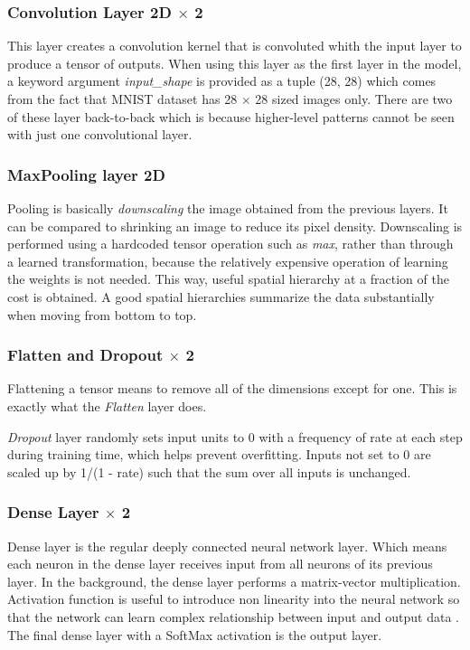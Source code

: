 \documentclass[12pt, a4paper]{report}
\begin{document}
\subsubsection{Convolution Layer 2D \texorpdfstring{$\times$}{x}  2} %
\label{subsubsec:convl2d2}
\hspace{0.5cm} This layer creates a convolution kernel that is convoluted whith the input layer to produce a tensor of outputs. When using this layer as the first layer in the model, a keyword argument \textit{input\_shape} is provided as a tuple (28, 28) which comes from the fact that MNIST dataset has 28 $\times$ 28 sized images only. There are two of these layer back-to-back which is because higher-level patterns cannot be seen with just one convolutional layer. 

\subsubsection{MaxPooling layer 2D}
\label{subsubsec:maxpool2d}
Pooling is basically \textit{downscaling} the image obtained from the previous layers. It can be compared to shrinking an image to reduce its pixel density. Downscaling is performed using a hardcoded tensor operation such as \textit{max}, rather than through a learned transformation, because the relatively expensive operation of learning the weights \cite{2017arXiv170603059K} is not needed. This way, useful spatial hierarchy at a fraction of the cost is obtained. A good spatial hierarchies summarize the data substantially when moving from bottom to top.

\subsubsection{Flatten and Dropout \texorpdfstring{$\times$}{x} 2}
\label{subsubsec:drptfltn}
\hspace{0.5cm} Flattening a tensor means to remove all of the dimensions except for one. This is exactly what the \textit{Flatten} layer does.

\textit{Dropout} layer randomly sets input units to 0 with a frequency of rate at each step during training time, which helps prevent overfitting. Inputs not set to 0 are scaled up by 1/(1 - rate) such that the sum over all inputs is unchanged.

\subsubsection{Dense Layer \texorpdfstring{$\times$}{x} 2}
\label{subsubsec:dnslyr}
\hspace{0.5cm} Dense layer is the regular deeply connected neural network layer. Which means each neuron in the dense layer receives input from all neurons of its previous layer. In the background, the dense layer performs a matrix-vector multiplication. Activation function is useful to introduce non linearity into the neural network so that the network can learn complex relationship between input and output data \cite{art:kerasdense}. The final dense layer with a SoftMax activation is the output layer.
\end{document}
